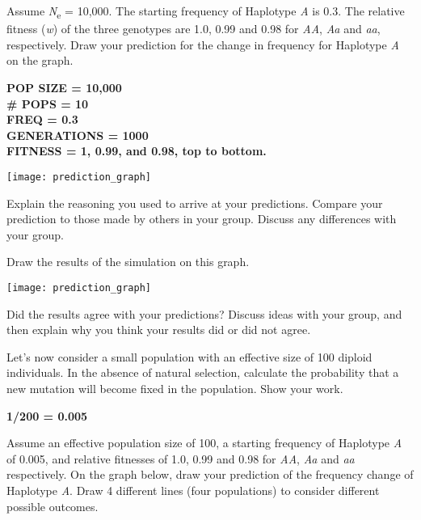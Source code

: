 \documentclass[11pt, addpoints]{exam}
\begin{document}
\begin{questions}
\question
Assume \emph{N}\textsubscript{e} = 10,000. The starting
frequency of Haplotype \emph{A} is 0.3. The relative fitness (\emph{w})
of the three genotypes are 1.0, 0.99 and 0.98 for \emph{AA}, \emph{Aa}
and \emph{aa}, respectively. Draw your prediction for the change in
frequency for Haplotype \emph{A} on the graph.

\ifprintanswers
	{\bfseries %
	POP SIZE = 10,000\\
	\# POPS = 10\\
	FREQ = 0.3\\
	GENERATIONS = 1000\\	
	FITNESS = 1, 0.99, and 0.98, top to bottom. }\vspace*{16\baselineskip}
\else
	\begin{center}
		\texttt{[image: prediction\_graph]}
	\end{center}
\fi

\question
Explain the reasoning you used to arrive at your
predictions. Compare your prediction to those made by others in your
group. Discuss any differences with your group.
\newpage

\question
Draw the results of the simulation on this graph.
	\begin{center}
		\texttt{[image: prediction\_graph]}
	\end{center}

\question
Did the results agree with your predictions? Discuss ideas
with your group, and then explain why you think your results did or did
not agree.

\question[1]
Let's now consider a small population with an effective
size of 100 diploid individuals. In the absence of natural selection,
calculate the probability that a new mutation will become fixed in the
population. Show your work.

\ifprintanswers
	\textbf{1/200 = 0.005} 
\else
\fi
\newpage

\question
Assume an effective population size of 100, a starting
frequency of Haplotype \emph{A} of 0.005, and relative fitnesses of 1.0,
0.99 and 0.98 for \emph{AA}, \emph{Aa} and \emph{aa} respectively. On
the graph below, draw your prediction of the frequency change of
Haplotype \emph{A}. Draw 4 different lines (four populations) to
consider different possible outcomes.


\end{questions}
\end{document}
